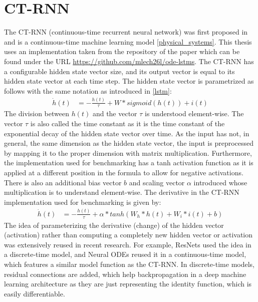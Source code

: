 \documentclass[draft,final]{vutinfth} %
\begin{document}
    \section{CT-RNN} \label{ctrnn}
    The CT-RNN (continuous-time recurrent neural network) was first proposed in \cite{CTRNN} and is a continuous-time machine learning model \ref{physical_systems}.
    This thesis uses an implementation taken from the repository of the paper \cite{ODELSTM} which can be found under the URL \url{https://github.com/mlech26l/ode-lstms}.
    The CT-RNN has a configurable hidden state vector size, and its output vector is equal to its hidden state vector at each time step.
    The hidden state vector is parametrized as follows \cite[p. 2]{CTRNN} with the same notation as introduced in \ref{lstm}:
    \begin{align}
        \label{paper_ct_rnn_function}
        \dot h(t) &= -\frac{h(t)}{\tau} + W * sigmoid(h(t)) + i(t)
    \end{align}
    The division between $h(t)$ and the vector $\tau$ is understood element-wise. The vector $\tau$ is also called the time constant as it is the time constant of the exponential decay of the hidden state vector over time.
    As the input has not, in general, the same dimension as the hidden state vector, the input is preprocessed by mapping it to the proper dimension with matrix multiplication.
    Furthermore, the implementation used for benchmarking has a tanh activation function as it is applied at a different position in the formula to allow for negative activations.
    There is also an additional bias vector $b$ and scaling vector $\alpha$ introduced whose multiplication is to understand element-wise.
    The derivative in the CT-RNN implementation used for benchmarking is given by:
    \begin{align}
        \label{used_ct_rnn_function}
        \dot h(t) &= -\frac{h(t)}{\tau} + \alpha * tanh(W_h * h(t) + W_i * i(t) + b)
    \end{align}
    The idea of parameterizing the derivative (change) of the hidden vector (activation) rather than computing a completely new hidden vector or activation was extensively reused in recent research.
    For example, ResNets \cite{ResNet} used the idea in a discrete-time model, and Neural ODEs \cite{NeuralODEs} reused it in a continuous-time model, which features a similar model function as the CT-RNN.
    In discrete-time models, residual connections are added, which help backpropagation in a deep machine learning architecture as they are just representing the identity function, which is easily differentiable.
\end{document}
